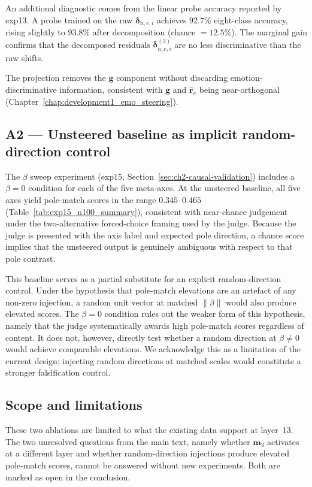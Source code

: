 An additional diagnostic comes from the linear probe accuracy reported by exp13. A probe trained on the raw $\boldsymbol{\delta}_{n,e,i}$ achieves $92.7\%$ eight-class accuracy, rising slightly to $93.8\%$ after decomposition (chance $= 12.5\%$). The marginal gain confirms that the decomposed residuals $\boldsymbol{\delta}^{(3)}_{n,e,i}$ are no less discriminative than the raw shifts.\par

The projection removes the $\mathbf{g}$ component without discarding emotion-discriminative information, consistent with $\mathbf{g}$ and $\hat{\mathbf{r}}_e$ being near-orthogonal (Chapter~\ref{chap:development1_emo_steering}).

\subsection*{A2 — Unsteered baseline as implicit random-direction control}

The $\beta$ sweep experiment (exp15, Section~\ref{sec:ch2-causal-validation}) includes a $\beta=0$ condition for each of the five meta-axes. At the unsteered baseline, all five axes yield pole-match scores in the range $0.345$--$0.465$ (Table~\ref{tab:exp15_n100_summary}), consistent with near-chance judgement under the two-alternative forced-choice framing used by the judge. Because the judge is presented with the axis label and expected pole direction, a chance score implies that the unsteered output is genuinely ambiguous with respect to that pole contrast.

This baseline serves as a partial substitute for an explicit random-direction control. Under the hypothesis that pole-match elevations are an artefact of any non-zero injection, a random unit vector at matched $\|\beta\|$ would also produce elevated scores. The $\beta=0$ condition rules out the weaker form of this hypothesis, namely that the judge systematically awards high pole-match scores regardless of content. It does not, however, directly test whether a random direction at $\beta \neq 0$ would achieve comparable elevations. We acknowledge this as a limitation of the current design; injecting random directions at matched scales would constitute a stronger falsification control.

\subsection*{Scope and limitations}

These two ablations are limited to what the existing data support at layer~13. The two unresolved questions from the main text, namely whether $\mathbf{m}_3$ activates at a different layer and whether random-direction injections produce elevated pole-match scores, cannot be answered without new experiments. Both are marked as open in the conclusion.
